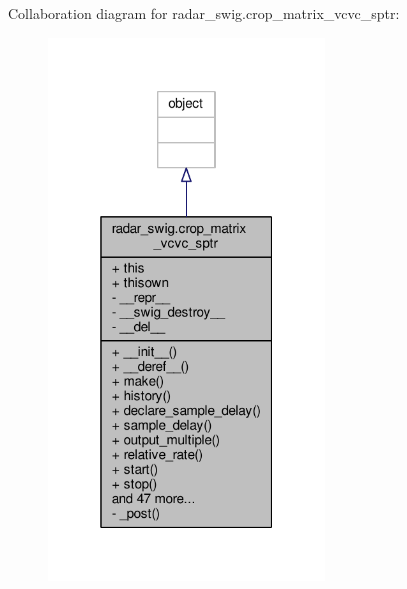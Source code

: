 Collaboration diagram for radar\+\_\+swig.\+crop\+\_\+matrix\+\_\+vcvc\+\_\+sptr\+:
\nopagebreak
\begin{figure}[H]
\begin{center}
\leavevmode
\includegraphics[width=208pt]{dc/d5a/classradar__swig_1_1crop__matrix__vcvc__sptr__coll__graph}
\end{center}
\end{figure}
